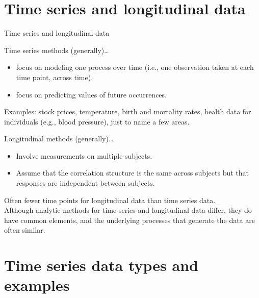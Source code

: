 \documentclass[
  9pt,
  ignorenonframetext,
]{beamer}
\providecommand{\tightlist}{%
  \setlength{\itemsep}{0pt}\setlength{\parskip}{0pt}}
\begin{document}
\hypertarget{time-series-and-longitudinal-data}{%
\section{Time series and longitudinal
data}\label{time-series-and-longitudinal-data}}

\begin{frame}{Time series and longitudinal data}
\begin{block}{Time series methods (generally)\ldots{}}
\protect\hypertarget{time-series-methods-generally}{}
\begin{itemize}
\tightlist
\item
  focus on modeling one process over time (i.e., one observation taken
  at each time point, across time).
\item
  focus on predicting values of future occurrences.
\end{itemize}

Examples: stock prices, temperature, birth and mortality rates, health
data for individuals (e.g., blood pressure), just to name a few areas.
\end{block}

\begin{block}{Longitudinal methods (generally)\ldots{}}
\protect\hypertarget{longitudinal-methods-generally}{}
\begin{itemize}
\tightlist
\item
  Involve measurements on multiple subjects.
\item
  Assume that the correlation structure is the same across subjects but
  that responses are independent between subjects.
\end{itemize}

Often fewer time points for longitudinal data than time series data.\\
Although analytic methods for time series and longitudinal data differ,
they do have common elements, and the underlying processes that generate
the data are often similar.
\end{block}
\end{frame}

\hypertarget{time-series-data-types-and-examples}{%
\section{Time series data types and
examples}\label{time-series-data-types-and-examples}}
\end{document}
